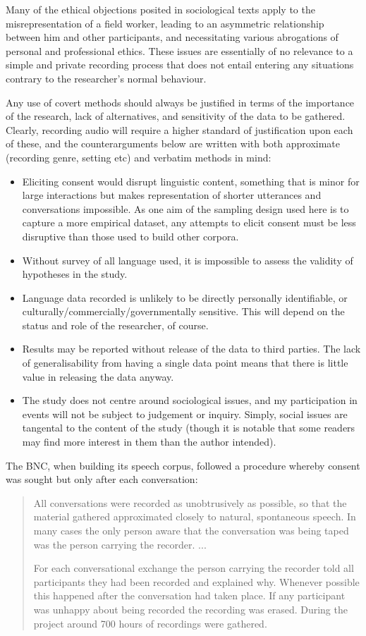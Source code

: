 Many of the ethical objections posited in sociological texts apply to the misrepresentation of a field worker, leading to an asymmetric relationship between him and other participants, and necessitating various abrogations of personal and professional ethics. These issues are essentially of no relevance to a simple and private recording process that does not entail entering any situations contrary to the researcher’s normal behaviour.

Any use of covert methods should always be justified in terms of the importance of the research, lack of alternatives, and sensitivity of the data to be gathered. Clearly, recording audio will require a higher standard of justification upon each of these, and the counterarguments below are written with both approximate (recording genre, setting etc) and verbatim methods in mind:

\begin{itemize}
    \item Eliciting consent would disrupt linguistic content, something that is minor for large interactions but makes representation of shorter utterances and conversations impossible. As one aim of the sampling design used here is to capture a more empirical dataset, any attempts to elicit consent must be less disruptive than those used to build other corpora.
    \item Without survey of all language used, it is impossible to assess the validity of hypotheses in the study.
    \item Language data recorded is unlikely to be directly personally identifiable, or culturally/commercially/governmentally sensitive. This will depend on the status and role of the researcher, of course.
    \item Results may be reported without release of the data to third parties. The lack of generalisability from having a single data point means that there is little value in releasing the data anyway.
    \item The study does not centre around sociological issues, and my participation in events will not be subject to judgement or inquiry. Simply, social issues are tangental to the content of the study (though it is notable that some readers may find more interest in them than the author intended).
\end{itemize}


The BNC, when building its speech corpus, followed a procedure whereby consent was sought but only after each conversation:
\begin{quote}
All conversations were recorded as unobtrusively as possible, so that the material gathered approximated closely to natural, spontaneous speech. In many cases the only person aware that the conversation was being taped was the person carrying the recorder. ...

For each conversational exchange the person carrying the recorder told all participants they had been recorded and explained why. Whenever possible this happened after the conversation had taken place. If any participant was unhappy about being recorded the recording was erased. During the project around 700 hours of recordings were gathered.
\end{quote}

